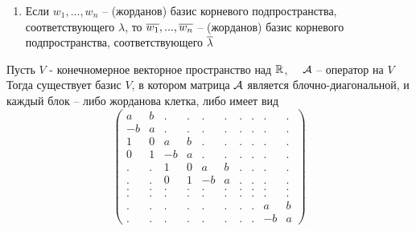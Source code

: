 \begin{lemma}
\begin{enumerate}
\begin{proof}
			$ \implies \ol{P}(t) $ аннулирует $ \ol{w} $ (из 3 св-ва)
			$$ \ol{P}(t) = (t - \ol{\lambda})^k $$
		\end{proof}
		\item Если $ w_1, ..., w_n $ -- (жорданов) базис корневого подпространства, соответствующего $ \lambda $, то $ \overline{w_1}, ..., \overline{w_n} $ -- (жорданов) базис корневого подпространства, соответствующего $ \overline{\lambda} $ 
	\end{enumerate}
\end{lemma}

\begin{theorem}
	Пусть $ V $ - конечномерное векторное пространство над $ \mathbb{R} $, $ \quad \mathcal{A} $ -- оператор на $ V $ \\
	Тогда существует базис $ V $, в котором матрица $ \mathcal{A} $ является блочно-диагональной, и каждый блок -- либо жорданова клетка, либо имеет вид
	$$
	\begin{pmatrix}
		a & b & . & . & . & . & . & . & . & . \\
		-b & a & . & . & . & . & . & . & . & . \\
		1 & 0 & a & b & . & . & . & . & . & . \\
		0 & 1 & -b & a & . & . & . & . & . & . \\
		. & . & 1 & 0 & a & b & . & . & . & . \\
		. & . & 0 & 1 & -b & a & . & . & . & . \\
		. & . & . & . & . & . & . & . & . & . \\
		. & . & . & . & . & . & . & . & . & . \\
		. & . & . & . & . & . & . & . & a & b \\
		. & . & . & . & . & . & . & . & -b & a
	\end{pmatrix} $$
\end{theorem}

